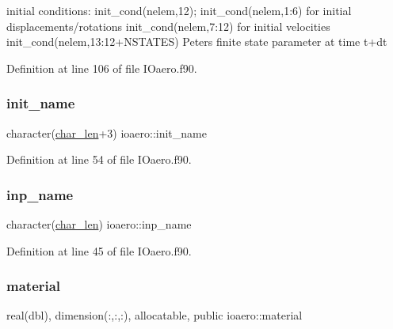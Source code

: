 initial conditions\+: init\+\_\+cond(nelem,12); init\+\_\+cond(nelem,1\+:6) for initial displacements/rotations init\+\_\+cond(nelem,7\+:12) for initial velocities init\+\_\+cond(nelem,13\+:12+\+N\+S\+T\+A\+T\+ES) Peters finite state parameter at time t+dt 



Definition at line 106 of file I\+Oaero.\+f90.

\mbox{\label{namespaceioaero_a5a12b8b21f86b26e7364428778a85d0b}} 
\subsubsection{\texorpdfstring{init\+\_\+name}{init\_name}}
{\footnotesize\ttfamily character(\hyperlink{namespaceioaero_acd6bdfdcfd986fd1c26261e5996e3b03}{char\+\_\+len}+3) ioaero\+::init\+\_\+name\hspace{0.3cm}{\ttfamily [private]}}



Definition at line 54 of file I\+Oaero.\+f90.

\mbox{\label{namespaceioaero_ae3b39e5c092106ddc3bb8b81daf8bd13}} 
\subsubsection{\texorpdfstring{inp\+\_\+name}{inp\_name}}
{\footnotesize\ttfamily character(\hyperlink{namespaceioaero_acd6bdfdcfd986fd1c26261e5996e3b03}{char\+\_\+len}) ioaero\+::inp\+\_\+name\hspace{0.3cm}{\ttfamily [private]}}



Definition at line 45 of file I\+Oaero.\+f90.

\mbox{\label{namespaceioaero_a83ca534029c39300d045045432607a69}} 
\subsubsection{\texorpdfstring{material}{material}}
{\footnotesize\ttfamily real(dbl), dimension(\+:,\+:,\+:), allocatable, public ioaero\+::material}



